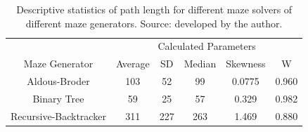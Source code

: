    \begin{table}[!ht]
        \centering
        \caption{Descriptive statistics of path length for different maze solvers of different maze generators. Source: developed by the author.}
        \begin{tabular}{c c c c c c}
        \hline
            ~&\multicolumn{5}{c}{Calculated Parameters}\\
            Maze Generator & Average & SD & Median & Skewness & W\\ \hline \hline
            Aldous-Broder & 103 & 52 & 99 & 0.0775 & 0.960\\ 
            Binary Tree & 59 & 25 & 57 & 0.329 & 0.982\\ 
            Recursive-Backtracker & 311 & 227 & 263 & 1.469 & 0.880\\ \hline
        \end{tabular}
    \end{table}
    \newpage
